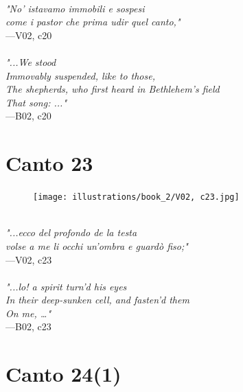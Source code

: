\documentclass[../Dore_vision.tex]{subfiles}
\begin{document}
\begin{center}
\begin{minipage}{0.8\linewidth}
\textit{\\
"No’ istavamo immobili e sospesi\\come i pastor che prima udir quel canto,"} \\
—V02, c20 \\~\\
\textit{"...We stood\\Immovably suspended, like to those,\\The shepherds, who first heard in Bethlehem's field\\That song: ..."} \\
—B02, c20
\end{minipage}
\end{center}

\newpage

\section{Canto 23}

\begin{figure}[ht]
\centering
\texttt{[image: illustrations/book\_2/V02, c23.jpg]}
\end{figure}

\begin{center}
\begin{minipage}{0.8\linewidth}
\textit{\\
"...ecco del profondo de la testa\\volse a me li occhi un’ombra e guard\`o fiso;"} \\
—V02, c23 \\~\\
\textit{"...lo! a spirit turn'd his eyes\\In their deep-sunken cell, and fasten'd them\\On me, …"} \\
—B02, c23
\end{minipage}
\end{center}

\newpage

\section{Canto 24(1)}
\end{document}
